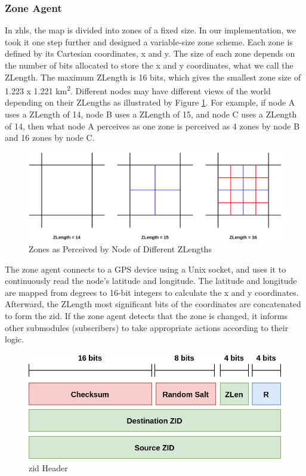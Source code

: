 \subsubsection{Zone Agent}
\qquad In \acrshort{zhls}, the map is divided into zones of a fixed size. In our implementation, we took it one step further and designed a variable-size zone scheme. Each zone is defined by its Cartesian coordinates, x and y. The size of each zone depends on the number of bits allocated to store the x and y coordinates, what we call the ZLength. The maximum ZLength is 16 bits, which gives the smallest zone size of 1.223 x 1.221 km\textsuperscript{2}. Different nodes may have different views of the world depending on their ZLengths as illustrated by Figure \ref{fig:zlength}. For example, if node A uses a ZLength of 14, node B uses a ZLength of 15, and node C uses a ZLength of 14, then what node A perceives as one zone is perceived as 4 zones by node B and 16 zones by node C.

\begin{figure}[!htb]
    \centering
    \includegraphics[width=\linewidth]{images/zlength.png}
    \caption{Zones as Perceived by Node of Different ZLengths}
    \label{fig:zlength}
\end{figure}

The zone agent connects to a GPS device using a Unix socket, and uses it to continuously read the node's latitude and longitude. The latitude and longitude are mapped from degrees to 16-bit integers to calculate the x and y coordinates. Afterward, the ZLength most significant bits of the coordinates are concatenated to form the \acrfull{zid}. If the zone agent detects that the zone is changed, it informs other submodules (subscribers) to take appropriate actions according to their logic.

\begin{figure}[!htb]
    \centering
    \includegraphics[width=0.8\linewidth]{images/zid.png}
    \caption{\acrshort{zid} Header}
    \label{fig:zid}
\end{figure}

